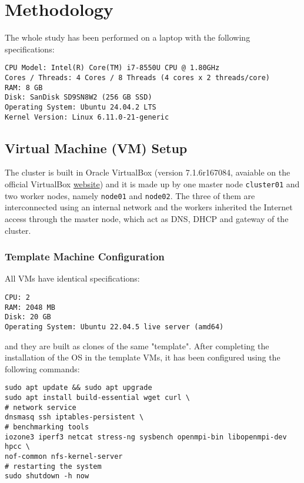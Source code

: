 \section{Methodology}

The whole study has been performed on a laptop with the following specifications:

\begin{verbatim}
CPU Model: Intel(R) Core(TM) i7-8550U CPU @ 1.80GHz
Cores / Threads: 4 Cores / 8 Threads (4 cores x 2 threads/core)
RAM: 8 GB
Disk: SanDisk SD9SN8W2 (256 GB SSD)
Operating System: Ubuntu 24.04.2 LTS
Kernel Version: Linux 6.11.0-21-generic
\end{verbatim}


\subsection{Virtual Machine (VM) Setup}

The cluster is built in Oracle VirtualBox (version 7.1.6r167084, avaiable on the official VirtualBox \href{https://www.virtualbox.org/}{website}) and it is made up by one master node \texttt{cluster01} and two worker nodes, namely \texttt{node01} and \texttt{node02}. The three of them are interconnected using an internal network and the workers inherited the Internet access through the master node, which act as DNS, DHCP and gateway of the cluster.

\subsubsection{Template Machine Configuration}

All VMs have identical specifications:
\begin{verbatim}
CPU: 2
RAM: 2048 MB
Disk: 20 GB
Operating System: Ubuntu 22.04.5 live server (amd64)
\end{verbatim}

and they are built as clones of the same "template". After completing the installation of the OS in the template VMs, it has been configured using the following commands:

\begin{verbatim}
sudo apt update && sudo apt upgrade
sudo apt install build-essential wget curl \
# network service
dnsmasq ssh iptables-persistent \
# benchmarking tools
iozone3 iperf3 netcat stress-ng sysbench openmpi-bin libopenmpi-dev hpcc \
nof-common nfs-kernel-server
# restarting the system
sudo shutdown -h now
\end{verbatim}

